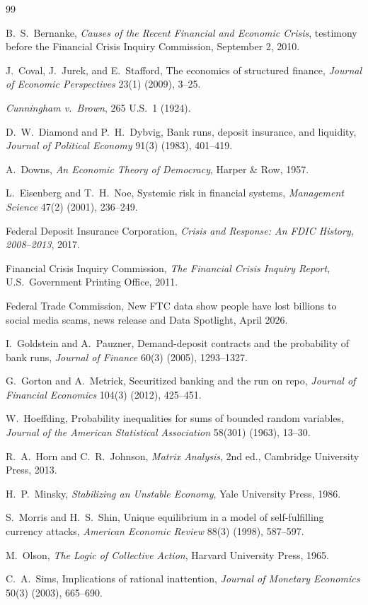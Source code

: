 \documentclass[11pt]{article}
\theoremstyle{definition}
\theoremstyle{remark}
\begin{document}
\begin{thebibliography}{99}

 B.~S.~Bernanke, \emph{Causes of the Recent Financial and Economic Crisis}, testimony before the Financial Crisis Inquiry Commission, September 2, 2010.

 J.~Coval, J.~Jurek, and E.~Stafford, The economics of structured finance, \emph{Journal of Economic Perspectives} 23(1) (2009), 3--25.

 \emph{Cunningham v.\ Brown}, 265 U.S.\ 1 (1924).

 D.~W.~Diamond and P.~H.~Dybvig, Bank runs, deposit insurance, and liquidity, \emph{Journal of Political Economy} 91(3) (1983), 401--419.

 A.~Downs, \emph{An Economic Theory of Democracy}, Harper \& Row, 1957.

 L.~Eisenberg and T.~H.~Noe, Systemic risk in financial systems, \emph{Management Science} 47(2) (2001), 236--249.

 Federal Deposit Insurance Corporation, \emph{Crisis and Response: An FDIC History, 2008--2013}, 2017.

 Financial Crisis Inquiry Commission, \emph{The Financial Crisis Inquiry Report}, U.S.\ Government Printing Office, 2011.

 Federal Trade Commission, New FTC data show people have lost billions to social media scams, news release and Data Spotlight, April 2026.

 I.~Goldstein and A.~Pauzner, Demand-deposit contracts and the probability of bank runs, \emph{Journal of Finance} 60(3) (2005), 1293--1327.

 G.~Gorton and A.~Metrick, Securitized banking and the run on repo, \emph{Journal of Financial Economics} 104(3) (2012), 425--451.

 W.~Hoeffding, Probability inequalities for sums of bounded random variables, \emph{Journal of the American Statistical Association} 58(301) (1963), 13--30.

 R.~A.~Horn and C.~R.~Johnson, \emph{Matrix Analysis}, 2nd ed., Cambridge University Press, 2013.

 H.~P.~Minsky, \emph{Stabilizing an Unstable Economy}, Yale University Press, 1986.

 S.~Morris and H.~S.~Shin, Unique equilibrium in a model of self-fulfilling currency attacks, \emph{American Economic Review} 88(3) (1998), 587--597.

 M.~Olson, \emph{The Logic of Collective Action}, Harvard University Press, 1965.

 C.~A.~Sims, Implications of rational inattention, \emph{Journal of Monetary Economics} 50(3) (2003), 665--690.

\end{thebibliography}
\end{document}
